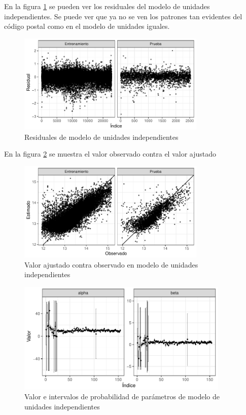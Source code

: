 En la figura \ref{fig:no_pooling_resids} se pueden ver los residuales del modelo de unidades independientes. Se puede ver que ya no se ven los patrones tan evidentes del código postal como en el modelo de unidades iguales.

\begin{figure}[H]
    \centering
    \includegraphics[width=0.8\textwidth]{images/no_pooling_resids.pdf}
    \caption{Residuales de modelo de unidades independientes}
    \label{fig:no_pooling_resids}
\end{figure}

En la figura \ref{fig:no_pooling_obs_vs_pred} se muestra el valor observado contra el valor ajustado

\begin{figure}[H]
    \centering
    \includegraphics[width=0.8\textwidth]{images/no_pooling_obs_vs_pred.pdf}
    \caption{Valor ajustado contra observado en modelo de unidades independientes}
    \label{fig:no_pooling_obs_vs_pred}
\end{figure}

\begin{figure}[H]
    \centering
    \includegraphics[width=0.9\textwidth]{images/no_pooling_param_values.pdf}
    \caption{Valor e intervalos de probabilidad de parámetros de modelo de unidades independientes}
    \label{fig:no_pooling_param_values}
\end{figure}




